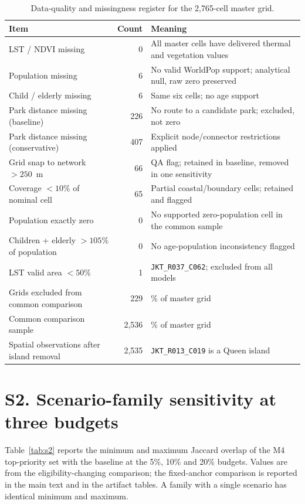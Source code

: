\documentclass[times,twoside]{_Templates/MultiTargetManuscript}
\begin{document}
\begin{table}[H]
\centering
\small
\caption{Data-quality and missingness register for the 2,765-cell master grid.}
\label{tab:s1}
\begin{tabularx}{\textwidth}{@{}>{\raggedright\arraybackslash}p{8.0cm} r >{\raggedright\arraybackslash}X@{}}
\toprule
Item & Count & Meaning \\
\midrule
LST / NDVI missing & 0 & All master cells have delivered thermal and vegetation values \\
Population missing & 6 & No valid WorldPop support; analytical null, raw zero preserved \\
Child / elderly missing & 6 & Same six cells; no age support \\
Park distance missing (baseline) & 226 & No route to a candidate park; excluded, not zero \\
Park distance missing (conservative) & 407 & Explicit node/connector restrictions applied \\
Grid snap to network $>250$~m & 66 & QA flag; retained in baseline, removed in one sensitivity \\
Coverage $<10\%$ of nominal cell & 65 & Partial coastal/boundary cells; retained and flagged \\
Population exactly zero & 0 & No supported zero-population cell in the common sample \\
Children + elderly $>105\%$ of population & 0 & No age-population inconsistency flagged \\
LST valid area $<50\%$ & 1 & \texttt{JKT\_R037\_C062}; excluded from all models \\
Grids excluded from common comparison & 229 & 8.28\% of master grid \\
Common comparison sample & 2,536 & 91.72\% of master grid \\
Spatial observations after island removal & 2,535 & \texttt{JKT\_R013\_C019} is a Queen island \\
\bottomrule
\end{tabularx}
\end{table}

\section*{S2. Scenario-family sensitivity at three budgets}

Table~\ref{tab:s2} reports the minimum and maximum Jaccard overlap of the M4
top-priority set with the baseline at the 5\%, 10\% and 20\% budgets. Values are
from the eligibility-changing comparison; the fixed-anchor comparison is
reported in the main text and in the artifact tables. A family with a single
scenario has identical minimum and maximum.
\end{document}
